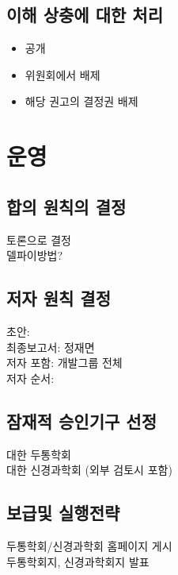 \documentclass{paper}
\begin{document}
\subsection{이해 상충에 대한 처리}
\begin{itemize}
	\item 공개
	\item 위원회에서 배제
	\item 해당 권고의 결정권 배제
\end{itemize}

\vspace{30pt}
\section{운영}
\subsection{합의 원칙의 결정}
토론으로 결정\\
델파이방법?

\subsection{저자 원칙 결정}
초안: \\
최종보고서: 정재면\\
저자 포함: 개발그룹 전체\\
저자 순서: 

\subsection{잠재적 승인기구 선정}
대한 두통학회\\
대한 신경과학회 (외부 검토시 포함)

\subsection{보급및 실행전략}
두통학회/신경과학회 홈페이지 게시\\
두통학회지, 신경과학회지 발표
\end{document}
